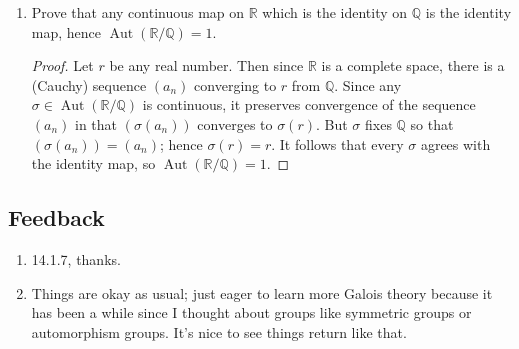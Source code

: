 \documentclass[11pt]{article}
\DeclareMathOperator\Aut{Aut}
\begin{document}
\begin{enumerate}
\begin{enumerate}
\begin{proof}
            We show that $\sigma$ is continuous at every real number $r$. Let $\varepsilon>0$ be given, and choose $m$ large enough so that $\frac{1}{m}<\varepsilon$. If $\abs{x-r}<\frac{1}{m}$, then by the above argument $\abs{\sigma(x) - \sigma(r)}< \frac{1}{m} < \varepsilon$ so that $\sigma$ is continuous at $r$. Since $r$ was arbitrary, $\sigma$ is continuous on $\mathbb{R}$.
        \end{proof}
        \item Prove that any continuous map on $\mathbb{R}$ which is the identity on $\mathbb{Q}$ is the identity map, hence $\Aut(\mathbb{R}/\mathbb{Q}) = 1$. \begin{proof}
            Let $r$ be any real number. Then since $\mathbb{R}$ is a complete space, there is a (Cauchy) sequence $(a_n)$ converging to $r$ from $\mathbb{Q}$. Since any $\sigma\in \Aut(\mathbb{R}/\mathbb{Q})$ is continuous, it preserves convergence of the sequence $(a_n)$ in that $(\sigma(a_n))$ converges to $\sigma(r)$. But $\sigma$ fixes $\mathbb{Q}$ so that $(\sigma(a_n)) = (a_n)$; hence $\sigma(r) = r$. It follows that every $\sigma$ agrees with the identity map, so $\Aut(\mathbb{R}/\mathbb{Q}) = 1$.
        \end{proof}
    \end{enumerate}
\end{enumerate}
\subsection*{Feedback}
\begin{enumerate}
    \item 14.1.7, thanks.
    \item Things are okay as usual; just eager to learn more Galois theory because it has been a while since I thought about groups like symmetric groups or automorphism groups. It's nice to see things return like that.
\end{enumerate}
\end{document}
